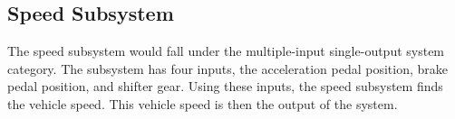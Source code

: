 \documentclass[conference]{IEEEtran}
\begin{document}


  \subsection{Speed Subsystem}
  The speed subsystem would fall under the multiple-input single-output system category. %
  The subsystem has four inputs, the acceleration pedal position, brake pedal position, and shifter gear. Using these inputs, the speed subsystem finds the vehicle speed. This vehicle speed is then the output of the system.



\end{document}
